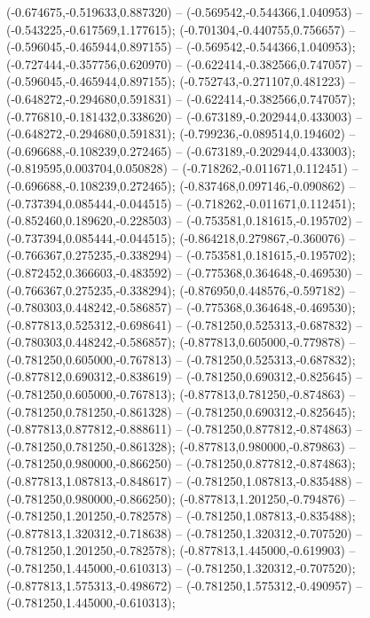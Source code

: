  (-0.674675,-0.519633,0.887320) -- (-0.569542,-0.544366,1.040953) -- (-0.543225,-0.617569,1.177615);
 (-0.701304,-0.440755,0.756657) -- (-0.596045,-0.465944,0.897155) -- (-0.569542,-0.544366,1.040953);
 (-0.727444,-0.357756,0.620970) -- (-0.622414,-0.382566,0.747057) -- (-0.596045,-0.465944,0.897155);
 (-0.752743,-0.271107,0.481223) -- (-0.648272,-0.294680,0.591831) -- (-0.622414,-0.382566,0.747057);
 (-0.776810,-0.181432,0.338620) -- (-0.673189,-0.202944,0.433003) -- (-0.648272,-0.294680,0.591831);
 (-0.799236,-0.089514,0.194602) -- (-0.696688,-0.108239,0.272465) -- (-0.673189,-0.202944,0.433003);
 (-0.819595,0.003704,0.050828) -- (-0.718262,-0.011671,0.112451) -- (-0.696688,-0.108239,0.272465);
 (-0.837468,0.097146,-0.090862) -- (-0.737394,0.085444,-0.044515) -- (-0.718262,-0.011671,0.112451);
 (-0.852460,0.189620,-0.228503) -- (-0.753581,0.181615,-0.195702) -- (-0.737394,0.085444,-0.044515);
 (-0.864218,0.279867,-0.360076) -- (-0.766367,0.275235,-0.338294) -- (-0.753581,0.181615,-0.195702);
 (-0.872452,0.366603,-0.483592) -- (-0.775368,0.364648,-0.469530) -- (-0.766367,0.275235,-0.338294);
 (-0.876950,0.448576,-0.597182) -- (-0.780303,0.448242,-0.586857) -- (-0.775368,0.364648,-0.469530);
 (-0.877813,0.525312,-0.698641) -- (-0.781250,0.525313,-0.687832) -- (-0.780303,0.448242,-0.586857);
 (-0.877813,0.605000,-0.779878) -- (-0.781250,0.605000,-0.767813) -- (-0.781250,0.525313,-0.687832);
 (-0.877812,0.690312,-0.838619) -- (-0.781250,0.690312,-0.825645) -- (-0.781250,0.605000,-0.767813);
 (-0.877813,0.781250,-0.874863) -- (-0.781250,0.781250,-0.861328) -- (-0.781250,0.690312,-0.825645);
 (-0.877813,0.877812,-0.888611) -- (-0.781250,0.877812,-0.874863) -- (-0.781250,0.781250,-0.861328);
 (-0.877813,0.980000,-0.879863) -- (-0.781250,0.980000,-0.866250) -- (-0.781250,0.877812,-0.874863);
 (-0.877813,1.087813,-0.848617) -- (-0.781250,1.087813,-0.835488) -- (-0.781250,0.980000,-0.866250);
 (-0.877813,1.201250,-0.794876) -- (-0.781250,1.201250,-0.782578) -- (-0.781250,1.087813,-0.835488);
 (-0.877813,1.320312,-0.718638) -- (-0.781250,1.320312,-0.707520) -- (-0.781250,1.201250,-0.782578);
 (-0.877813,1.445000,-0.619903) -- (-0.781250,1.445000,-0.610313) -- (-0.781250,1.320312,-0.707520);
 (-0.877813,1.575313,-0.498672) -- (-0.781250,1.575312,-0.490957) -- (-0.781250,1.445000,-0.610313);
